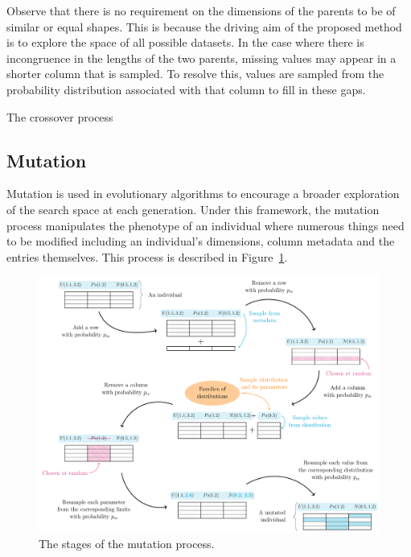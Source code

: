 \documentclass[smallextended]{svjour3}
\newcommand{\balg}[1][htbp]{%
    \begin{algorithm}[#1]\DontPrintSemicolon
}
\newcommand{\ealg}{%
    \end{algorithm}
}
\begin{document}
Observe that there is no requirement on the dimensions of the parents to be of
similar or equal shapes. This is because the driving aim of the proposed method
is to explore the space of all possible datasets. In the case where there is
incongruence in the lengths of the two parents, missing values may appear in a
shorter column that is sampled. To resolve this, values are sampled from the
probability distribution associated with that column to fill in these gaps.

\balg%

\caption{The crossover process}
\ealg%

\subsection{Mutation}\label{subsection:mutation}

Mutation is used in evolutionary algorithms to encourage a broader exploration
of the search space at each generation. Under this framework, the mutation
process manipulates the phenotype of an individual where numerous things need to
be modified including an individual's dimensions, column metadata and the
entries themselves. This process is described in Figure~\ref{fig:mutation}.

\begin{figure}[htbp]
    \centering
    \includegraphics[width=\linewidth]{Fig6.pdf}
    \caption{%
        The stages of the mutation process.
    }\label{fig:mutation}
\end{figure}
\end{document}
